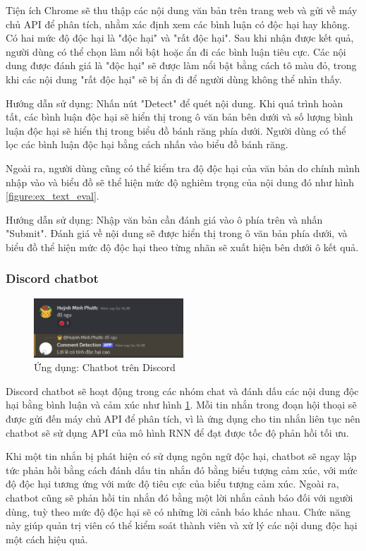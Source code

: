 

Tiện ích Chrome sẽ thu thập các nội dung văn bản trên trang web và gửi về máy chủ API để phân tích, nhằm xác định xem các bình luận có độc hại hay không. Có hai mức độ độc hại là "độc hại" và "rất độc hại". Sau khi nhận được kết quả, người dùng có thể chọn làm nổi bật hoặc ẩn đi các bình luận tiêu cực. Các nội dung được đánh giá là "độc hại" sẽ được làm nổi bật bằng cách tô màu đỏ, trong khi các nội dung "rất độc hại" sẽ bị ẩn đi để người dùng không thể nhìn thấy.

Hướng dẫn sử dụng: Nhấn nút "Detect" để quét nội dung. Khi quá trình hoàn tất, các bình luận độc hại sẽ hiển thị trong ô văn bản bên dưới và số lượng bình luận độc hại sẽ hiển thị trong biểu đồ bánh răng phía dưới. Người dùng có thể lọc các bình luận độc hại bằng cách nhấn vào biểu đồ bánh răng.

Ngoài ra, người dùng cũng có thể kiểm tra độ độc hại của văn bản do chính mình nhập vào và biểu đồ sẽ thể hiện mức độ nghiêm trọng của nội dung đó như hình \ref{figure:ex_text_eval}.

Hướng dẫn sử dụng: Nhập văn bản cần đánh giá vào ô phía trên và nhấn "Submit". Đánh giá về nội dung sẽ được hiển thị trong ô văn bản phía dưới, và biểu đồ thể hiện mức độ độc hại theo từng nhãn sẽ xuất hiện bên dưới ô kết quả.

\subsubsection{Discord chatbot}
\begin{figure}[htb]
    \centering
    \includegraphics[width=0.5\textwidth]{image/bot_discord.png}
    \caption{Ứng dụng: Chatbot trên Discord}
    \label{figure:bot_discord}
\end{figure}

Discord chatbot sẽ hoạt động trong các nhóm chat và đánh dấu các nội dung độc hại bằng bình luận và cảm xúc như hình \ref{figure:bot_discord}. Mỗi tin nhắn trong đoạn hội thoại sẽ được gửi đến máy chủ API để phân tích, vì là ứng dụng cho tin nhắn liên tục nên chatbot sẽ sử dụng API của mô hình RNN để đạt được tốc độ phản hồi tối ưu. 

Khi một tin nhắn bị phát hiện có sử dụng ngôn ngữ độc hại, chatbot sẽ ngay lập tức phản hồi bằng cách đánh dấu tin nhắn đó bằng biểu tượng cảm xúc, với mức độ độc hại tương ứng với mức độ tiêu cực của biểu tượng cảm xúc. Ngoài ra, chatbot cũng sẽ phản hồi tin nhắn đó bằng một lời nhắn cảnh báo đối với người dùng, tuỳ theo mức độ độc hại sẽ có những lời cảnh báo khác nhau. Chức năng này giúp quản trị viên có thể kiểm soát thành viên và xử lý các nội dung độc hại một cách hiệu quả.